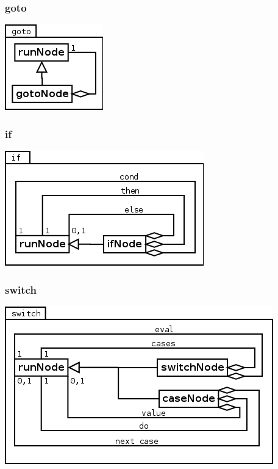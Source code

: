 \subsubsection{goto}
\begin{center}
\includegraphics[scale=0.4]{goto.png} \\
\end{center}

\subsubsection{if}
\begin{center}
\includegraphics[scale=0.4]{if.png} \\
\end{center}

\subsubsection{switch}
\begin{center}
\includegraphics[scale=0.4]{switch.png} \\
\end{center}

